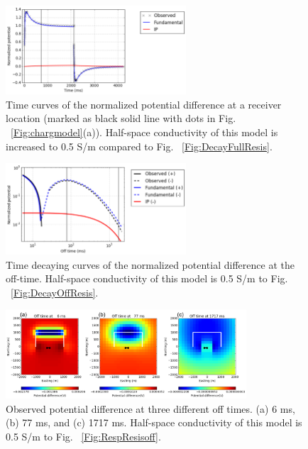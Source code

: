 \documentclass[letterpaper,11pt]{article}
\begin{document}
\begin{figure}[htb]
  \centering
  \includegraphics[width=0.6\textwidth]{figures/DecayFullCond.png}
  \caption{Time curves of the normalized potential difference at a receiver location (marked as black solid line with dots in Fig. ~\ref{Fig:chargmodel}(a)). Half-space conductivity of this model is increased to 0.5 S/m compared to Fig. ~\ref{Fig:DecayFullResis}.}
  \label{Fig:DecayFullCond}
\end{figure}

\begin{figure}[htb]
  \centering
  \includegraphics[width=0.6\textwidth]{figures/DecayOffCond.png}
  \caption{Time decaying curves of the normalized potential difference at the off-time. Half-space conductivity of this model is 0.5 S/m to Fig. ~\ref{Fig:DecayOffResis}.}
  \label{Fig:DecayOffCond}
\end{figure}

\begin{figure}[htb]
  \centering
  \includegraphics[width=0.8\textwidth]{figures/RespCondoff.png}
  \caption{Observed potential difference at three different off times. (a) 6 ms, (b) 77 ms, and (c) 1717 ms. Half-space conductivity of this model is 0.5 S/m to Fig. ~\ref{Fig:RespResisoff}.}
  \label{Fig:RespCondoff}
\end{figure}
\end{document}
